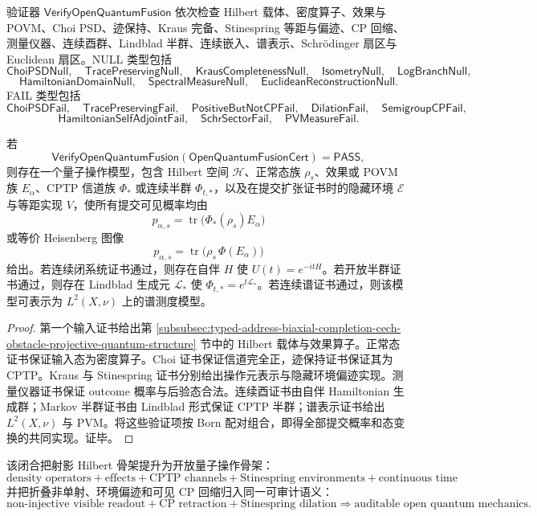 验证器 \(\mathsf{VerifyOpenQuantumFusion}\) 依次检查 Hilbert 载体、密度算子、效果与 POVM、Choi PSD、迹保持、Kraus 完备、Stinespring 等距与偏迹、CP 回缩、测量仪器、连续酉群、Lindblad 半群、连续嵌入、谱表示、Schr\"odinger 扇区与 Euclidean 扇区。NULL 类型包括
\[
\mathsf{ChoiPSDNull},\quad
\mathsf{TracePreservingNull},\quad
\mathsf{KrausCompletenessNull},\quad
\mathsf{IsometryNull},\quad
\mathsf{LogBranchNull},
\]
\[
\mathsf{HamiltonianDomainNull},\quad
\mathsf{SpectralMeasureNull},\quad
\mathsf{EuclideanReconstructionNull}.
\]
FAIL 类型包括
\[
\mathsf{ChoiPSDFail},\quad
\mathsf{TracePreservingFail},\quad
\mathsf{PositiveButNotCPFail},\quad
\mathsf{DilationFail},\quad
\mathsf{SemigroupCPFail},
\]
\[
\mathsf{HamiltonianSelfAdjointFail},\quad
\mathsf{SchrSectorFail},\quad
\mathsf{PVMeasureFail}.
\]

\begin{theorem}[开放量子融合的可靠性]\label{thm:typed-address-biaxial-completion-open-quantum-fusion-soundness}
若
\[
\mathsf{VerifyOpenQuantumFusion}
(\mathsf{OpenQuantumFusionCert})
=
\mathsf{PASS},
\]
则存在一个量子操作模型，包含 Hilbert 空间 \(\mathcal H\)、正常态族 \(\rho_s\)、效果或 POVM 族 \(E_\alpha\)、CPTP 信道族 \(\Phi_{\ast}\) 或连续半群 \(\Phi_{t,\ast}\)，以及在提交扩张证书时的隐藏环境 \(\mathcal E\) 与等距实现 \(V\)，使所有提交可见概率均由
\[
\boxed{
p_{\alpha,s}
=
\operatorname{tr}\bigl(\Phi_{\ast}(\rho_s)E_\alpha\bigr)
}
\]
或等价 Heisenberg 图像
\[
\boxed{
p_{\alpha,s}
=
\operatorname{tr}\bigl(\rho_s\,\Phi(E_\alpha)\bigr)
}
\]
给出。若连续闭系统证书通过，则存在自伴 \(H\) 使 \(U(t)=e^{-itH}\)。若开放半群证书通过，则存在 Lindblad 生成元 \(\mathcal L_{\ast}\) 使 \(\Phi_{t,\ast}=e^{t\mathcal L_{\ast}}\)。若连续谱证书通过，则该模型可表示为 \(L^2(X,\nu)\) 上的谱测度模型。
\end{theorem}
\begin{proof}
第一个输入证书给出第 \ref{subsubsec:typed-address-biaxial-completion-cech-obstacle-projective-quantum-structure} 节中的 Hilbert 载体与效果算子。正常态证书保证输入态为密度算子。Choi 证书保证信道完全正，迹保持证书保证其为 CPTP。Kraus 与 Stinespring 证书分别给出操作元表示与隐藏环境偏迹实现。测量仪器证书保证 outcome 概率与后验态合法。连续酉证书由自伴 Hamiltonian 生成群；Markov 半群证书由 Lindblad 形式保证 CPTP 半群；谱表示证书给出 \(L^2(X,\nu)\) 与 PVM。将这些验证项按 Born 配对组合，即得全部提交概率和态变换的共同实现。证毕。
\end{proof}

该闭合把射影 Hilbert 骨架提升为开放量子操作骨架：
\[
\boxed{
\text{density operators}
+
\text{effects}
+
\text{CPTP channels}
+
\text{Stinespring environments}
+
\text{continuous time}
}
\]
并把折叠非单射、环境偏迹和可见 CP 回缩归入同一可审计语义：
\[
\boxed{
\text{non-injective visible readout}
+
\text{CP retraction}
+
\text{Stinespring dilation}
\Longrightarrow
\text{auditable open quantum mechanics}.
}
\]
